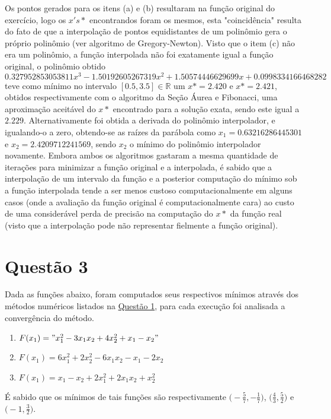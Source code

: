 \documentclass[fleqn, 11pt]{article}
\begin{document}
Os pontos gerados para os itens (a) e (b) resultaram na função original do exercício, logo os $x's*$ encontrandos foram os mesmos, esta "coincidência" resulta do fato de que a interpolação de pontos equidistantes de um polinômio gera o próprio polinômio (ver algoritmo de Gregory-Newton). Visto que o item (c) não era um polinômio, a função interpolada não foi exatamente igual a função original, o polinômio obtido $0.327952853053811 x^3 - 1.50192605267319 x^2 + 1.50574446629699 x + 0.0998334166468282$ teve como mínimo no intervalo $[0.5, 3.5] \in \mathbb{R}$ um $x* = 2.420$ e $x*=2.421$, obtidos respectivamente com o algoritmo da Seção Áurea e Fibonacci, uma aproximação aceitável do $x*$ encontrado para a solução exata, sendo este igual a $2.229$. Alternativamente foi obtida a derivada do polinômio interpolador, e igualando-o a zero, obtendo-se as raízes da parábola como $x_1 = 0.63216286445301$ e $x_2 = 2.4209712241569$, sendo $x_2$ o mínimo do polinômio interpolador novamente. Embora ambos os algoritmos gastaram a mesma quantidade de iterações para minimizar a função original e a interpolada, é sabido que a interpolação de um intervalo da função e a posterior computação do mínimo sob a função interpolada tende a ser menos custoso computacionalmente em alguns casos (onde a avaliação da função original é computacionalmente cara) ao custo de uma considerável perda de precisão na computação do $x*$ da função real (visto que a interpolação pode não representar fielmente a função original).
\newpage

\section*{Questão 3}
Dada as funções abaixo, foram computados seus respectivos mínimos através dos métodos numéricos listados na \hyperref[Q1]{Questão 1}, para cada execução foi analisada a convergência do método. 
\begin{enumerate}[label=(\alph*)]
\item \hyperref[Q3A]{$F(x_1) = "x_1^2 - 3 x_1 x_2 + 4 x_2^2 + x_1 - x_2"$}
\item \hyperref[Q3B]{$F(x_1) = 6 x_1^2 + 2 x_2^2 - 6 x_1 x_2 - x_1 - 2 x_2$}
\item \hyperref[Q3B]{$F(x_1) = x_1 - x_2 + 2 x_1^2 + 2 x_1 x_2 + x_2^2$  }
\end{enumerate}

É sabido que os mínimos de tais funções são respectivamente $\big (-\frac{5}{7},-\frac{1}{7} \big )$, $\big ( \frac{4}{3},\frac{5}{2} \big )$ e $\big  (-1,\frac{3}{2} \big )$.
\end{document}
